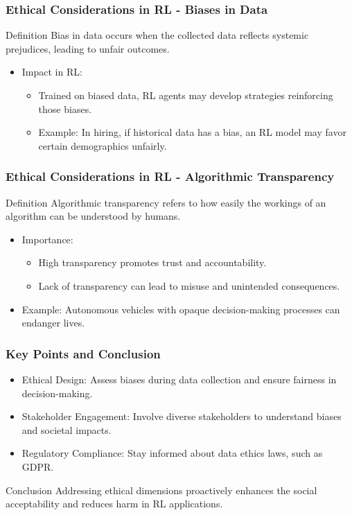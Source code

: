 \documentclass[aspectratio=169]{beamer}
\begin{document}
\begin{frame}[fragile]
    \frametitle{Ethical Considerations in RL - Biases in Data}
    \begin{block}{Definition}
        Bias in data occurs when the collected data reflects systemic prejudices, leading to unfair outcomes.
    \end{block}
    \begin{itemize}
        \item Impact in RL:
        \begin{itemize}
            \item Trained on biased data, RL agents may develop strategies reinforcing those biases.
            \item Example: In hiring, if historical data has a bias, an RL model may favor certain demographics unfairly.
        \end{itemize}
    \end{itemize}
\end{frame}

\begin{frame}[fragile]
    \frametitle{Ethical Considerations in RL - Algorithmic Transparency}
    \begin{block}{Definition}
        Algorithmic transparency refers to how easily the workings of an algorithm can be understood by humans.
    \end{block}
    \begin{itemize}
        \item Importance:
        \begin{itemize}
            \item High transparency promotes trust and accountability.
            \item Lack of transparency can lead to misuse and unintended consequences.
        \end{itemize}
        \item Example: Autonomous vehicles with opaque decision-making processes can endanger lives.
    \end{itemize}
\end{frame}

\begin{frame}[fragile]
    \frametitle{Key Points and Conclusion}
    \begin{itemize}
        \item Ethical Design: Assess biases during data collection and ensure fairness in decision-making.
        \item Stakeholder Engagement: Involve diverse stakeholders to understand biases and societal impacts.
        \item Regulatory Compliance: Stay informed about data ethics laws, such as GDPR.
    \end{itemize}
    \begin{block}{Conclusion}
        Addressing ethical dimensions proactively enhances the social acceptability and reduces harm in RL applications.
    \end{block}
\end{frame}
\end{document}
